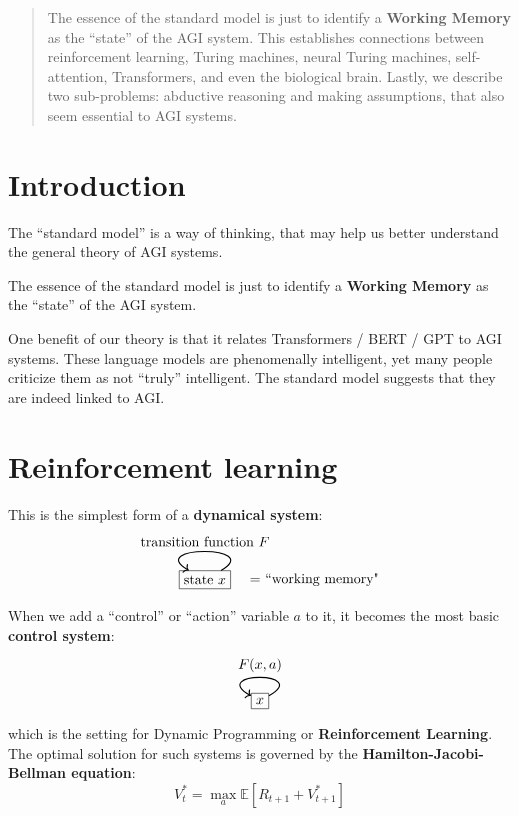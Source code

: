 \maketitle

\begin{abstract}
The essence of the standard model is just to identify a \textbf{Working Memory} as the ``state'' of the AGI system.  This establishes connections between reinforcement learning, Turing machines, neural Turing machines, self-attention, Transformers, and even the biological brain.  Lastly, we describe two sub-problems: abductive reasoning and making assumptions, that also seem essential to AGI systems.
\end{abstract}


\setcounter{section}{-1}
\section{Introduction}

The ``standard model'' is a way of thinking, that may help us better understand the general theory of AGI systems.

The essence of the standard model is just to identify a \textbf{Working Memory} as the ``state'' of the AGI system.

One benefit of our theory is that it relates Transformers / BERT / GPT to AGI systems.  These language models are phenomenally intelligent, yet many people criticize them as not ``truly'' intelligent.  The standard model suggests that they are indeed linked to AGI.

\section{Reinforcement learning}

This is the simplest form of a \textbf{dynamical system}:
\begin{equation}
\begin{tikzpicture}[->]
\node[rectangle,draw,label=0:{{$\quad =$} ``working memory"}] (C) {state $x$};
\path (C) edge [out=30,in=150,looseness=4,thick] node [above] {transition function $F$} (C);
\end{tikzpicture}
\end{equation}
When we add a ``control'' or ``action'' variable $a$ to it, it becomes the most basic  \textbf{control system}:
\begin{equation}
\begin{tikzpicture}[->]
\node[rectangle,draw] (C) {$x$};
\path (C) edge [out=30,in=150,looseness=7,thick] node [above] {$F(x, a)$} (C);
\end{tikzpicture}
\end{equation}
which is the setting for Dynamic Programming or \textbf{Reinforcement Learning}.  The optimal solution for such systems is governed by the \textbf{Hamilton-Jacobi-Bellman equation}:
\begin{equation}
V^*_t = \max_a \mathbb{E} [ R_{t+1} + V^*_{t+1} ]
\end{equation}



